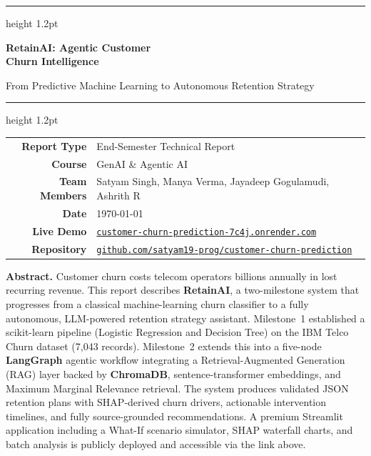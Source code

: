 \documentclass[11pt]{article}
\begin{document}
\begin{titlepage}
\centering
\vspace*{1.8cm}

{\color{rulecol}\hrule height 1.2pt}
\vspace{16pt}

{\fontsize{26}{33}\selectfont\bfseries\color{primary}
  RetainAI: Agentic Customer\\[4pt] Churn Intelligence}

\vspace{12pt}
{\large\color{muted}
  From Predictive Machine Learning to Autonomous Retention Strategy}

\vspace{16pt}
{\color{rulecol}\hrule height 1.2pt}

\vspace{2.2cm}

\renewcommand{\arraystretch}{1.6}
{\normalsize\color{primary}
\begin{tabular}{r l}
  \textbf{Report Type}    & End-Semester Technical Report \\
  \textbf{Course}         & GenAI \& Agentic AI \\
  \textbf{Team Members}   & Satyam Singh, Manya Verma, Jayadeep Gogulamudi, Ashrith R  \\
  \textbf{Date}           & \today \\
  \textbf{Live Demo}      &
    \href{https://customer-churn-prediction-7c4j.onrender.com/}%
    {\texttt{customer-churn-prediction-7c4j.onrender.com}} \\
  \textbf{Repository}     &
    \href{https://github.com/satyam19-prog/customer-churn-prediction}%
    {\texttt{github.com/satyam19-prog/customer-churn-prediction}} \\
\end{tabular}}

\vspace{2.4cm}

\begin{mdframed}[style=infobox]
\textbf{Abstract.}\quad
Customer churn costs telecom operators billions annually in lost recurring
revenue. This report describes \textbf{RetainAI}, a two-milestone system
that progresses from a classical machine-learning churn classifier to a fully
autonomous, LLM-powered retention strategy assistant. Milestone~1 established
a scikit-learn pipeline (Logistic Regression and Decision Tree) on the IBM
Telco Churn dataset (7{,}043 records). Milestone~2 extends this into a
five-node \textbf{LangGraph} agentic workflow integrating a
Retrieval-Augmented Generation (RAG) layer backed by \textbf{ChromaDB},
sentence-transformer embeddings, and Maximum Marginal Relevance retrieval.
The system produces validated JSON retention plans with SHAP-derived churn
drivers, actionable intervention timelines, and fully source-grounded
recommendations. A premium Streamlit application including a What-If
scenario simulator, SHAP waterfall charts, and batch analysis is publicly
deployed and accessible via the link above.
\end{mdframed}

\end{titlepage}
\end{document}
